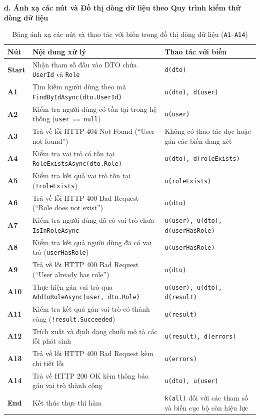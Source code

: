 \documentclass[11pt,a4paper]{article}
\begin{document}
\noindent\textbf{d. Ánh xạ các nút và Đồ thị dòng dữ liệu theo Quy trình kiểm thử dòng dữ liệu}

\begin{table}[H]
\centering
\scriptsize
\begin{tabularx}{\textwidth}{|C{1.3cm}|X|L{5.5cm}|}
\hline
{}
\textbf{Nút} & \textbf{Nội dung xử lý} & \textbf{Thao tác với biến} \tabularnewline
\hline
\textbf{Start} & Nhận tham số đầu vào DTO chứa \texttt{UserId} và \texttt{Role} & \texttt{d(dto)} \\ \hline
\textbf{A1} & Tìm kiếm người dùng theo mã \texttt{FindByIdAsync(dto.UserId)} & \texttt{u(dto), d(user)} \\ \hline
\textbf{A2} & Kiểm tra người dùng có tồn tại trong hệ thống (\texttt{user == null}) & \texttt{u(user)} \\ \hline
\textbf{A3} & Trả về lỗi HTTP 404 Not Found (``User not found'') & Không có thao tác đọc hoặc gán các biến đang xét \\ \hline
\textbf{A4} & Kiểm tra vai trò có tồn tại \texttt{RoleExistsAsync(dto.Role)} & \texttt{u(dto), d(roleExists)} \\ \hline
\textbf{A5} & Kiểm tra kết quả vai trò tồn tại (\texttt{!roleExists}) & \texttt{u(roleExists)} \\ \hline
\textbf{A6} & Trả về lỗi HTTP 400 Bad Request (``Role does not exist'') & \texttt{u(dto)} \\ \hline
\textbf{A7} & Kiểm tra người dùng đã có vai trò chưa \texttt{IsInRoleAsync} & \texttt{u(user), u(dto), d(userHasRole)} \\ \hline
\textbf{A8} & Kiểm tra kết quả người dùng đã có vai trò (\texttt{userHasRole}) & \texttt{u(userHasRole)} \\ \hline
\textbf{A9} & Trả về lỗi HTTP 400 Bad Request (``User already has role'') & \texttt{u(dto)} \\ \hline
\textbf{A10} & Thực hiện gán vai trò qua \texttt{AddToRoleAsync(user, dto.Role)} & \texttt{u(user), u(dto), d(result)} \\ \hline
\textbf{A11} & Kiểm tra kết quả gán vai trò có thành công (\texttt{!result.Succeeded}) & \texttt{u(result)} \\ \hline
\textbf{A12} & Trích xuất và định dạng chuỗi mô tả các lỗi phát sinh & \texttt{u(result), d(errors)} \\ \hline
\textbf{A13} & Trả về lỗi HTTP 400 Bad Request kèm chi tiết lỗi & \texttt{u(errors)} \\ \hline
\textbf{A14} & Trả về HTTP 200 OK kèm thông báo gán vai trò thành công & \texttt{u(dto), u(user)} \\ \hline
\textbf{End} & Kết thúc thực thi hàm & \texttt{k(all)} đối với các tham số và biến cục bộ còn hiệu lực \\ \hline
\end{tabularx}
\caption{Bảng ánh xạ các nút và thao tác với biến trong đồ thị dòng dữ liệu (\texttt{A1}--\texttt{A14})}
\end{table}
\end{document}
